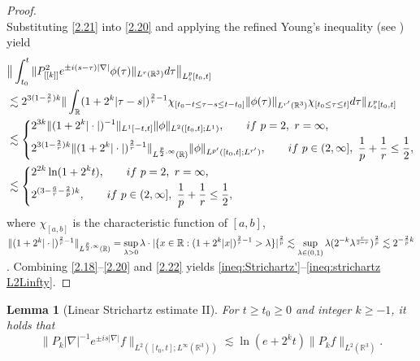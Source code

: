 \documentclass[11pt,twoside]{article}
\def\R{\mathop{\mathbb R\kern 0pt}\nolimits}
\def\ds{\displaystyle}
\def\f{\frac}
\def\ls{\lesssim}
\theoremstyle{plain}
\newtheorem{lemma}[theorem]{Lemma}
\theoremstyle{definition}
\numberwithin{equation}{section}
\begin{document}
\begin{proof}
\begin{equation}
		\end{equation}
		Substituting \eqref{2.21} into \eqref{2.20} and applying the refined Young's inequality (see \cite[Theorem 1.5]{Chemin}) yield
		\begin{equation}\label{2.22}
			\begin{split}
				&\big\|\int_{t_0}^{t}
				\|P_{[[k]]}^2 e^{\pm i(s-\tau)|\nabla|} \phi(\tau) \|_{L^r(\mathbb{R}^3)} d\tau\big\|_{L^p_s[t_0,t]}\\
				&\ls 2^{3(1-\f 2r)k} \| \int_{\mathbb{R}}(1+2^k|\tau-s|)^{\f 2r-1}\chi_{[t_0-t\le \tau-s\le t-t_0]}\|\phi(\tau)\|_{L^{r'}{(\R^3)}}\chi_{[t_0\le\tau\le t]}d\tau\|_{L^p_s{[t_0,t]}}\\
				&\ls
				\left\{
				\begin{aligned}
				&2^{3k} \|(1 + 2^k |\cdot|)^{-1}\|_{L^{1}[-t,t]}\|\phi\|_{L^{2}([t_0,t];L^1)},\quad\quad if\ p=2,\ r = \infty,\\
				&2^{3(1-\f 2r)k} \|(1 + 2^k |\cdot|)^{\f 2r-1}\|_{L^{\f{p}2,\infty}(\R)}\|\phi\|_{L^{p'}([t_0,t];L^{r'})},\quad\quad if\ p\in (2,\infty],\ \f1p+\f1r\le \f12,
				\end{aligned}
				\right.\\
				&\ls
				 \left\{
				\begin{aligned}
					&2^{2k}\ln(1+2^kt) ,\quad\quad if\ p = 2,\ r = \infty,\\
					&2^{(3-\f6r-\f2p)k},\quad\quad if\  p\in (2,\infty],\ \f1p+\f1r\le \f12,\\
				\end{aligned}
				\right.
			\end{split}
		\end{equation}
		where $\chi_{[a,b]}$ is the characteristic function of $[a,b]$, $\|(1 + 2^k |\cdot|)^{\f 2r-1}\|_{L^{\f{p}2,\infty}(\R)} = \ds\sup_{\lambda>0} \lambda\cdot|\{x\in\R:(1 + 2^k |x|)^{\f 2r-1}>\lambda\}|^{\f2p}\ls \ds\sup_{\lambda\in(0,1)}\lambda(2^{-k}\lambda^{\f{r}{2-r}})^{\f2p}\ls 2^{-\f2p k}$. Combining \eqref{2.18}--\eqref{2.20} and \eqref{2.22} yields \eqref{ineq:Strichartz'}--\eqref{ineq:strichartz L2Linfty}.
	\end{proof}
	\begin{lemma}[Linear Strichartz estimate II]\label{lem:strichartz L2Linfty2}
		For \( t \geq t_0 \geq 0 \) and integer \( k \geq -1 \), it holds that
		\begin{equation}\label{ineq:strichartz L2Linfty 2}
			\|P_k |\nabla|^{-1}e^{\pm is|\nabla|} f\|_{L^2([t_0,t];L^\infty(\mathbb{R}^3))} \lesssim \ln(e+2^kt)\|P_k f\|_{L^2(\mathbb{R}^3)}.
		\end{equation}
	\end{lemma}
\end{document}

